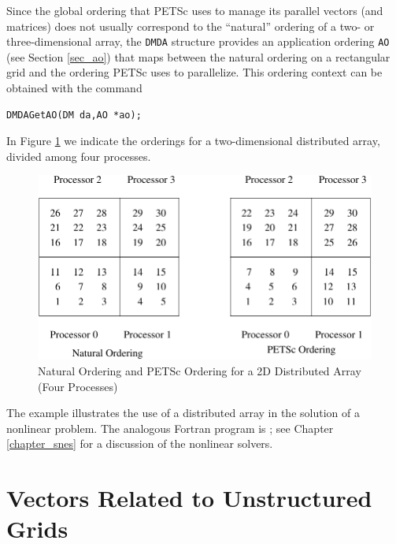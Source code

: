 Since the global ordering that PETSc uses to manage its parallel vectors
(and matrices) does not usually correspond to the ``natural'' ordering
of a two- or three-dimensional array, the \lstinline{DMDA} structure provides
an application ordering \lstinline{AO} (see Section \ref{sec_ao}) that maps
between the natural ordering on a rectangular grid and the ordering PETSc
uses to parallelize. This ordering context can be obtained with the command
\begin{lstlisting}
DMDAGetAO(DM da,AO *ao);
\end{lstlisting}
In Figure \ref{fig_daao} we indicate the orderings for a two-dimensional distributed
array, divided among four processes.

\begin{figure}[tb]
\centerline{ \includegraphics{danumbering}}
\caption{Natural Ordering and PETSc Ordering for a 2D Distributed Array (Four Processes)}
\label{fig_daao}
\end{figure}

The example
\href{http://www.mcs.anl.gov/petsc/petsc-current/src/snes/examples/tutorials/ex5.c.html}{}
illustrates the use of a distributed array in the solution of
a nonlinear problem.  The analogous Fortran program is
\href{http://www.mcs.anl.gov/petsc/petsc-current/src/snes/examples/tutorials/ex5.c.html}{};
see Chapter \ref{chapter_snes} for a discussion of the nonlinear
solvers.

\section{Vectors Related to Unstructured Grids}
\label{sec_unstruct}

